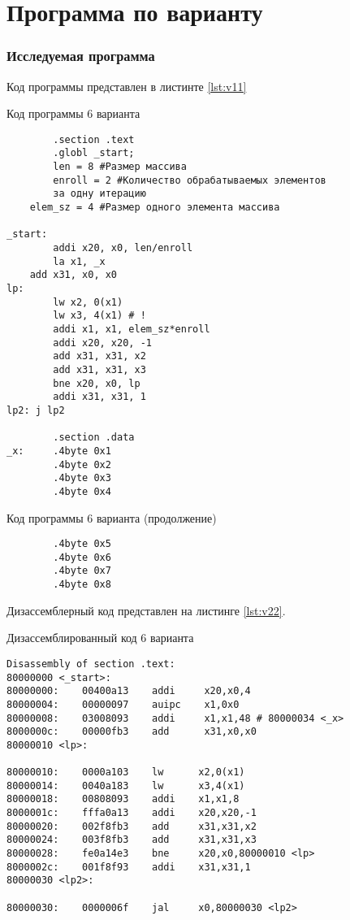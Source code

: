 \chapter*{Программа по варианту}

\subsection*{Исследуемая программа}

Код программы представлен в листинте \ref{lst:v11}

\begin{code}
\caption{Код программы 6 варианта}
\label{lst:v11}
\begin{verbatim}
        .section .text
        .globl _start;
        len = 8 #Размер массива
        enroll = 2 #Количество обрабатываемых элементов
        за одну итерацию
	elem_sz = 4 #Размер одного элемента массива

_start:
        addi x20, x0, len/enroll
        la x1, _x
	add x31, x0, x0
lp:
        lw x2, 0(x1)
        lw x3, 4(x1) # !
        addi x1, x1, elem_sz*enroll
        addi x20, x20, -1
        add x31, x31, x2
        add x31, x31, x3
        bne x20, x0, lp
        addi x31, x31, 1
lp2: j lp2

        .section .data
_x:     .4byte 0x1
        .4byte 0x2
        .4byte 0x3
        .4byte 0x4
\end{verbatim}
\end{code}

\begin{code}
\caption{Код программы 6 варианта (продолжение)}
\label{lst:v12}
\begin{verbatim}
        .4byte 0x5
        .4byte 0x6
        .4byte 0x7
        .4byte 0x8
\end{verbatim}
\end{code}


Дизассемблерный код представлен на листинге \ref{lst:v22}.

\begin{code}
\caption{Дизассемблированный код 6 варианта }
\label{lst:v22}

\begin{verbatim}
Disassembly of section .text:
80000000 <_start>:
80000000:    00400a13    addi     x20,x0,4
80000004:    00000097    auipc    x1,0x0
80000008:    03008093    addi     x1,x1,48 # 80000034 <_x>
8000000c:    00000fb3    add      x31,x0,x0
80000010 <lp>:

80000010:    0000a103    lw      x2,0(x1)
80000014:    0040a183    lw      x3,4(x1)
80000018:    00808093    addi    x1,x1,8
8000001c:    fffa0a13    addi    x20,x20,-1
80000020:    002f8fb3    add     x31,x31,x2
80000024:    003f8fb3    add     x31,x31,x3
80000028:    fe0a14e3    bne     x20,x0,80000010 <lp>
8000002c:    001f8f93    addi    x31,x31,1
80000030 <lp2>:

80000030:    0000006f    jal     x0,80000030 <lp2>
\end{verbatim}
\end{code}

